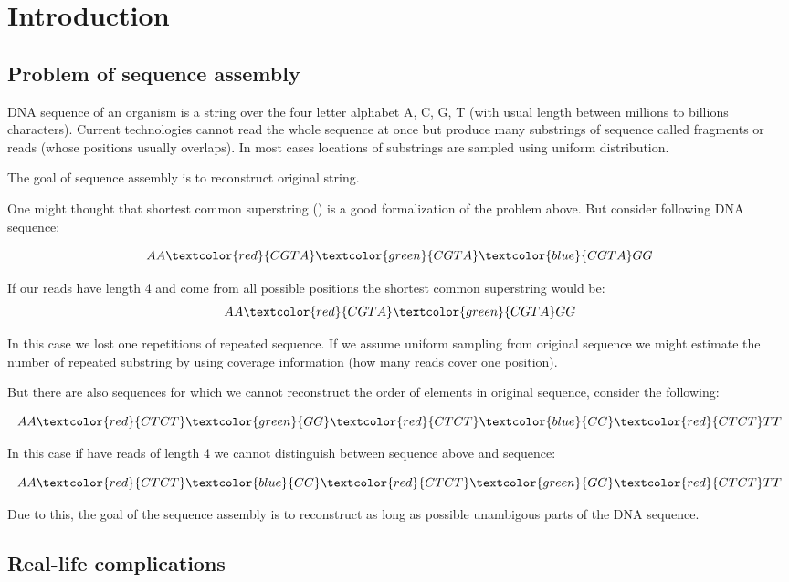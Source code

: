 \chapter{Introduction}

\section{Problem of sequence assembly}

DNA sequence of an organism is a string over the four letter alphabet A, C, G, T
(with usual length between millions to billions characters).
Current technologies cannot read the whole sequence at once but produce many
substrings of sequence called fragments or reads (whose positions usually overlaps).
In most cases locations of substrings are sampled using uniform distribution.

The goal of sequence assembly is to reconstruct original string.

One might thought that shortest common superstring (\cite{maier1977note}) 
is a good formalization of the problem above. But consider following DNA sequence:

$$AA\textcolor{red}{CGTA}\textcolor{green}{CGTA}\textcolor{blue}{CGTA}GG$$

If our reads have length 4 and come from all possible positions the shortest
common superstring would be:
$$AA\textcolor{red}{CGTA}\textcolor{green}{CGTA}GG$$

In this case we lost one repetitions of repeated sequence. If we assume uniform
sampling from original sequence we might estimate the number of repeated substring
by using coverage information (how many reads cover one position).

But there are also sequences for which we cannot reconstruct the order of elements in
original sequence, consider the following:

$$AA\textcolor{red}{CTCT}\textcolor{green}{GG}\textcolor{red}{CTCT}\textcolor{blue}{CC}\textcolor{red}{CTCT}TT$$

In this case if have reads of length 4 we cannot distinguish between sequence above and
sequence:

$$AA\textcolor{red}{CTCT}\textcolor{blue}{CC}\textcolor{red}{CTCT}\textcolor{green}{GG}\textcolor{red}{CTCT}TT$$

Due to this, the goal of the sequence assembly is to reconstruct as long as possible
unambigous parts of the DNA sequence.

\section{Real-life complications}

